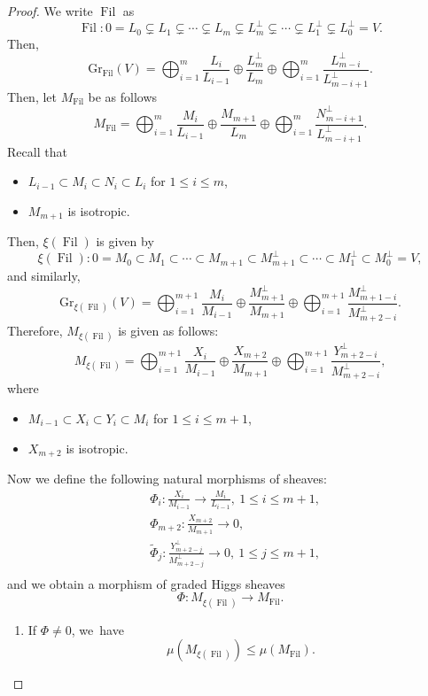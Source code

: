 \documentclass[JEP,XML,SOM,Unicode,published]{cedram}
\DeclareMathOperator{\Filt}{Fil}
\newcommand{\Gr}{\mathrm{Gr}}
\theoremstyle{plain}
\theoremstyle{definition}
\begin{document}
\begin{proof}
We write $\Filt$ as
\[
\Filt: 0= L_0 \subsetneq L_1 \subsetneq \cdots \subsetneq L_m \subsetneq L_m^\perp\subsetneq\cdots \subsetneq L_1^\perp\subsetneq L_0^\perp= V.
\]
Then,
\[
\Gr_{\Filt}(V)=\mathop{\bigoplus}_{i=1}^{m} \frac{L_i}{L_{i-1}}\oplus \frac{L_m^\perp}{L_m}\oplus \mathop{\bigoplus}_{i=1}^{m} \frac{L_{m-i}^\perp}{L_{m-i+1}^\perp}.
\]
Then, let $M_{\Filt}$ be as follows
\[
M_{\Filt}=\mathop{\bigoplus}_{i=1}^{m} \frac{M_i}{L_{i-1}}\oplus \frac{M_{m+1}}{L_m}\oplus \mathop{\bigoplus}_{i=1}^{m} \frac{N_{m-i+1}^\perp}{L_{m-i+1}^\perp}.
\]
Recall that
\begin{itemize}
\item $L_{i-1} \subset M_i \subset N_i \subset L_i$ for $1 \leq i \leq m$,
\item $M_{m+1}$ is isotropic.
\end{itemize}
Then, $\xi(\Filt)$ is given by
\[
\xi(\Filt):0=M_0\subset M_1\subset\cdots\subset M_{m+1}\subset M_{m+1}^\perp\subset\cdots\subset M_1^\perp\subset M_0^\perp=V,
\]
and similarly,
\[
\Gr_{\xi(\Filt)}(V)=\mathop{\bigoplus}_{i=1}^{m+1} \frac{M_i}{M_{i-1}}\oplus \frac{M_{m+1}^\perp}{M_{m+1}}\oplus \mathop{\bigoplus}_{i=1}^{m+1} \frac{M_{m+1-i}^\perp}{M_{m+2-i}^\perp}.
\]
Therefore, $M_{\xi(\Filt)}$ is given as follows:
\[
M_{\xi(\Filt)}=\mathop{\bigoplus}_{i=1}^{m+1} \frac{X_i}{M_{i-1}}\oplus \frac{X_{m+2}}{M_{m+1}}\oplus \mathop{\bigoplus}_{i=1}^{m+1} \frac{Y_{m+2-i}^\perp}{M_{m+2-i}^\perp},
\]
where
\begin{itemize}
\item $M_{i-1} \subset X_i \subset Y_i \subset M_i$ for $1 \leq i \leq m+1$,
\item $X_{m+2}$ is isotropic.
\end{itemize}

Now we define the following natural morphisms of sheaves:
\begin{equation}
\begin{split}
&\Phi_i:\frac{X_i}{M_{i-1}}\to \frac{M_i}{L_{i-1}},\ 1\leq i\leq m+1,\\
&\Phi_{m+2}:\frac{X_{m+2}}{M_{m+1}}\to 0,\\&\tilde{\Phi}_j:\frac{Y_{m+2-j}^\perp}{M_{m+2-j}^\perp}\to 0,\ 1\leq j\leq m+1,\\
\end{split}
\end{equation}
and we obtain a morphism of graded Higgs sheaves
\[
\Phi: M_{\xi(\Filt)}\to M_{\Filt}.
\]
\begin{enumerate}
\item If $\Phi\neq 0$, we~have
\[
\mu(M_{\xi(\Filt)})\leq \mu(M_{\Filt}).
\]


\end{enumerate}
\end{proof}
\end{document}
